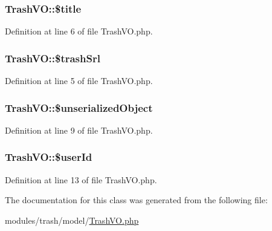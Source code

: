 \hypertarget{classTrashVO_ac6f85be76ea94f3fde44e0527bdcadc1}{
\subsubsection[{\$title}]{\setlength{\rightskip}{0pt plus 5cm}Trash\+V\+O\+::\$title}}\label{classTrashVO_ac6f85be76ea94f3fde44e0527bdcadc1}


Definition at line 6 of file Trash\+V\+O.\+php.

\hypertarget{classTrashVO_a8aeea2d547b7a335d987bcf4369a969c}{
\subsubsection[{\$trash\+Srl}]{\setlength{\rightskip}{0pt plus 5cm}Trash\+V\+O\+::\$trash\+Srl}}\label{classTrashVO_a8aeea2d547b7a335d987bcf4369a969c}


Definition at line 5 of file Trash\+V\+O.\+php.

\hypertarget{classTrashVO_a43048c60bc9505999742be271b5d9385}{
\subsubsection[{\$unserialized\+Object}]{\setlength{\rightskip}{0pt plus 5cm}Trash\+V\+O\+::\$unserialized\+Object}}\label{classTrashVO_a43048c60bc9505999742be271b5d9385}


Definition at line 9 of file Trash\+V\+O.\+php.

\hypertarget{classTrashVO_a346f371317bde03b5a209e00cb33a603}{
\subsubsection[{\$user\+Id}]{\setlength{\rightskip}{0pt plus 5cm}Trash\+V\+O\+::\$user\+Id}}\label{classTrashVO_a346f371317bde03b5a209e00cb33a603}


Definition at line 13 of file Trash\+V\+O.\+php.



The documentation for this class was generated from the following file\+:\begin{DoxyCompactItemize}
\item 
modules/trash/model/\hyperlink{TrashVO_8php}{Trash\+V\+O.\+php}\end{DoxyCompactItemize}
